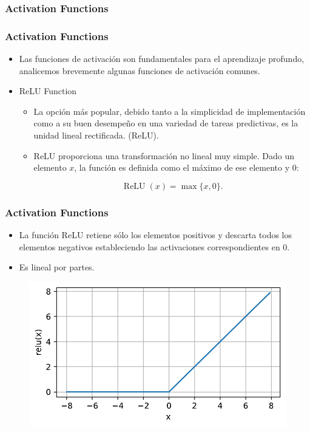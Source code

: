 \documentclass[
  shownotes,
  xcolor={svgnames},
  hyperref={colorlinks,citecolor=DarkBlue,linkcolor=DarkRed,urlcolor=DarkBlue}
  , aspectratio=169]{beamer}
\begin{document}
\subsubsection{Activation Functions}
\begin{frame}
\frametitle{Activation Functions}

\begin{itemize}
\item Las funciones de activación son fundamentales para el aprendizaje profundo, analicemos brevemente algunas funciones de activación comunes.
\medskip
\item ReLU Function
\begin{itemize}
\item La opción más popular, debido tanto a la simplicidad de implementación como a su buen desempeño en una variedad de tareas predictivas, es la unidad lineal rectificada. (ReLU). 
\medskip
\item ReLU proporciona una transformación no lineal muy simple. Dado un elemento $x$, la función es definida como el máximo de ese elemento y $0$:

$$\operatorname{ReLU}(x) = \max \{x, 0\}.$$

\end{itemize}
\end{itemize}

\end{frame}
\begin{frame}
\frametitle{Activation Functions}

\begin{itemize}
\item  La función ReLU retiene sólo los elementos positivos y descarta todos los elementos negativos estableciendo las activaciones correspondientes en 0. 
\item Es lineal por partes.
\end{itemize}



  \begin{figure}[H] \centering
            \captionsetup{justification=centering}
              \includegraphics[scale=0.45]{figures/relu}
              
 \end{figure}

\end{frame}
\end{document}
